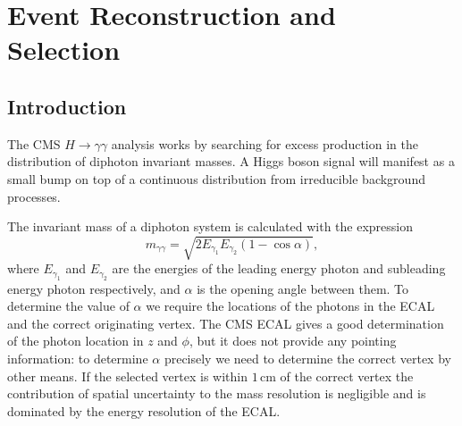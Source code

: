 \chapter{Event Reconstruction and Selection}
\label{chap:object_reco}

\newpage

\section{Introduction}

The CMS $H\rightarrow{\gamma\gamma}$ analysis works by searching for excess production in the distribution of diphoton invariant masses. A Higgs boson signal will manifest as a small bump on top of a continuous distribution from irreducible background processes.

The invariant mass of a diphoton system is calculated with the expression
\begin{equation}
    m_{\gamma\gamma} = \sqrt{2E_{\gamma_1}E_{\gamma_2}(1-\cos{\alpha})},
\end{equation}
where $E_{\gamma_1}$ and $E_{\gamma_2}$ are the energies of the leading energy photon and subleading energy photon respectively, and $\alpha$ is the opening angle between them. 
To determine the value of $\alpha$ we require the locations of the photons in the ECAL and the correct originating vertex. 
The CMS ECAL gives a good determination of the photon location in $z$ and $\phi$, but it does not provide any pointing information: to determine $\alpha$ precisely we need to determine the correct vertex by other means.
If the selected vertex is within $1$\,cm of the correct vertex the contribution of spatial uncertainty to the mass resolution is negligible and is dominated by the energy resolution of the ECAL. 


